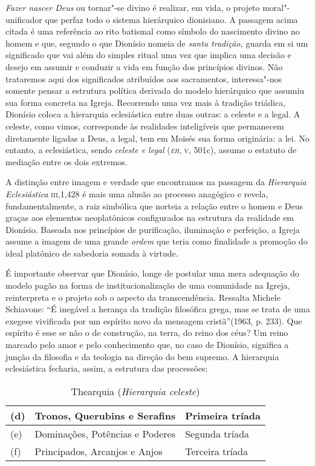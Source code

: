 {\emph{Fazer nascer Deus} ou tornar"-se divino é realizar, em vida, o
projeto moral"-unificador que perfaz todo o sistema hierárquico
dionisiano. A passagem acima citada é uma referência ao rito batismal
como símbolo do nascimento divino no homem e que, segundo o que
Dionísio nomeia de \emph{santa tradição,} guarda em si um significado
que vai além do simples ritual uma vez que implica uma decisão e desejo
em assumir e conduzir a vida em função dos princípios divinos. Não
trataremos aqui dos significados atribuídos aos sacramentos,
interessa"-nos somente pensar a estrutura política derivada do modelo
hierárquico que assumiu sua forma concreta na Igreja. Recorrendo uma
vez mais à tradição triádica, Dionísio coloca a hierarquia eclesiástica
entre duas outras: a celeste e a legal. A celeste, como vimos,
corresponde às realidades inteligíveis que permanecem diretamente
ligadas a Deus, a legal, tem em Moisés sua forma originária: a lei. No
entanto, a eclesiástica, sendo \emph{celeste e legal} (\emph{\textsc{eh}},
\textsc{v}, 501c), assume o estatuto de mediação entre os dois extremos.

A distinção entre imagem e verdade que encontramos na passagem da
\emph{Hierarquia Eclesiástica} \textsc{iii},1,428 é mais uma alusão ao
processo anagógico e revela, fundamentalmente, a raiz simbólica que
norteia a relação entre o homem e Deus graças aos elementos
neoplatônicos configurados na estrutura da realidade em Dionísio.
Baseada nos princípios de purificação, iluminação e perfeição, a Igreja
assume a imagem de uma grande \emph{ordem} que teria como finalidade
a promoção do ideal platônico de sabedoria somada à virtude. 

É importante observar que Dionísio, longe de postular uma mera adequação
do modelo pagão na forma de institucionalização de uma comunidade na
Igreja, reinterpreta e o projeto sob o aspecto da transcendência.
Ressalta Michele Schiavone: ``É inegável a herança da tradição
filosófica grega, mas se trata de uma exegese vivificada por um
espírito novo da mensagem cristã''(1963, p. 233). Que espírito é esse
se não o de construção, na terra, do reino dos céus? Um reino marcado
pelo amor e pelo conhecimento que, no caso de Dionísio, significa a
junção da filosofia e da teologia na direção do bem supremo. A
hierarquia eclesiástica fecharia, assim, a estrutura das processões:


\begin{table}[h]
\caption{Thearquia (\emph{Hierarquia celeste})}
\begin{tabular}{lll}
(d) &Tronos, Querubins e Serafins & Primeira tríada\\\hline 
(e) &Dominações, Potências e Poderes & Segunda tríada \\\hline
(f) &Principados, Arcanjos e Anjos & Terceira tríada
\end{tabular}
\end{table}


}
